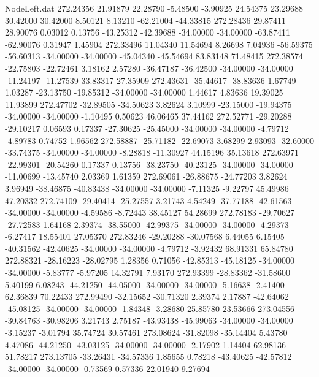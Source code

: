 \begin{filecontents}{NodeLeft.dat}
 272.24356   21.91879   22.28790    -5.48500   -3.90925   24.54375   23.29688   30.42000   30.42000    8.50121    8.13210  -62.21004  -44.33815
 272.28436   29.87411   28.90076     0.03012    0.13756  -43.25312  -42.39688  -34.00000  -34.00000  -63.87411  -62.90076    0.31947    1.45904
 272.33496   11.04340   11.54694     8.26698    7.04936  -56.59375  -56.60313  -34.00000  -34.00000  -45.04340  -45.54694   83.83148   71.48415
 272.38574  -22.75803  -22.72461     3.18162    2.57280  -36.47187  -36.42500  -34.00000  -34.00000  -11.24197  -11.27539   33.83317   27.35909
 272.43631  -35.44617  -38.83636     1.67749    1.03287  -23.13750  -19.85312  -34.00000  -34.00000    1.44617    4.83636   19.39025   11.93899
 272.47702  -32.89505  -34.50623     3.82624    3.10999  -23.15000  -19.94375  -34.00000  -34.00000   -1.10495    0.50623   46.06465   37.44162
 272.52771  -29.20288  -29.10217     0.06593    0.17337  -27.30625  -25.45000  -34.00000  -34.00000   -4.79712   -4.89783    0.74752    1.96562
 272.58887  -25.71182  -22.69073     3.68299    2.93093  -32.60000  -33.74375  -34.00000  -34.00000   -8.28818  -11.30927   44.15196   35.13618
 272.63971  -22.99301  -20.54260     0.17337    0.13756  -38.23750  -40.23125  -34.00000  -34.00000  -11.00699  -13.45740    2.03369    1.61359
 272.69061  -26.88675  -24.77203     3.82624    3.96949  -38.46875  -40.83438  -34.00000  -34.00000   -7.11325   -9.22797   45.49986   47.20332
 272.74109  -29.40414  -25.27557     3.21743    4.54249  -37.77188  -42.61563  -34.00000  -34.00000   -4.59586   -8.72443   38.45127   54.28699
 272.78183  -29.70627  -27.72583     1.64168    2.39374  -38.55000  -42.99375  -34.00000  -34.00000   -4.29373   -6.27417   18.55401   27.05370
 272.83246  -29.20288  -30.07568     6.44055    6.15405  -40.31562  -42.40625  -34.00000  -34.00000   -4.79712   -3.92432   68.91331   65.84780
 272.88321  -28.16223  -28.02795     1.28356    0.71056  -42.85313  -45.18125  -34.00000  -34.00000   -5.83777   -5.97205   14.32791    7.93170
 272.93399  -28.83362  -31.58600     5.40199    6.08243  -44.21250  -44.05000  -34.00000  -34.00000   -5.16638   -2.41400   62.36839   70.22433
 272.99490  -32.15652  -30.71320     2.39374    2.17887  -42.64062  -45.08125  -34.00000  -34.00000   -1.84348   -3.28680   25.85780   23.53666
 273.04556  -30.84763  -30.98206     3.21743    2.75187  -43.93438  -45.99063  -34.00000  -34.00000   -3.15237   -3.01794   35.74724   30.57461
 273.08624  -31.82098  -35.14404     5.43780    4.47086  -44.21250  -43.03125  -34.00000  -34.00000   -2.17902    1.14404   62.98136   51.78217
 273.13705  -33.26431  -34.57336     1.85655    0.78218  -43.40625  -42.57812  -34.00000  -34.00000   -0.73569    0.57336   22.01940    9.27694

\end{filecontents}
